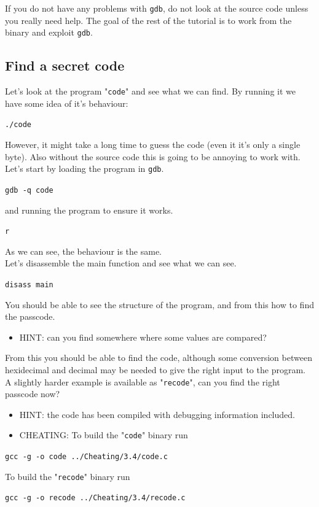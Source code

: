 \documentclass{article}
\begin{document}
\noindent If you do not have any problems with \lstinline{gdb}, do not look at the source code
unless you really need help. The goal of the rest of the tutorial is to work
from the binary and exploit \lstinline{gdb}.
\subsection{Find a secret code}
\noindent Let's look at the program "\lstinline{code}" and see what we can find. By running it
we have some idea of it's behaviour:
\begin{center}
    \lstinline{./code}
\end{center}
\noindent However, it might take a long time to guess the code (even it it's only a single byte). Also without the source code this is going to be annoying to
work with. Let's start by loading the program in \lstinline{gdb}.
\begin{center}
    \lstinline{gdb -q code}
\end{center}
\noindent and running the program to ensure it works.
\begin{center}
    \lstinline{r}
\end{center}
\noindent As we can see, the behaviour is the same.\\

\noindent Let's disassemble the main function and see what we can see.
\begin{center}
    \lstinline{disass main}
\end{center}
\noindent You should be able to see the structure of the program, and from this how to find the passcode.
\begin{itemize}
    \item HINT: can you find somewhere where some values are compared?
\end{itemize}
\noindent From this you should be able to find the code, although some conversion
between hexidecimal and decimal may be needed to give the right input to
the program.\\

\noindent A slightly harder example is available as "\lstinline{recode}", can you find the right passcode now?
\begin{itemize}
    \item HINT: the code has been compiled with debugging information included.
    \item CHEATING: To build the "\lstinline{code}" binary run
\end{itemize}
\begin{center}
    \lstinline{gcc -g -o code ../Cheating/3.4/code.c}
\end{center}
\noindent To build the "\lstinline{recode}" binary run
\begin{center}
    \lstinline{gcc -g -o recode ../Cheating/3.4/recode.c}
\end{center}
\end{document}
